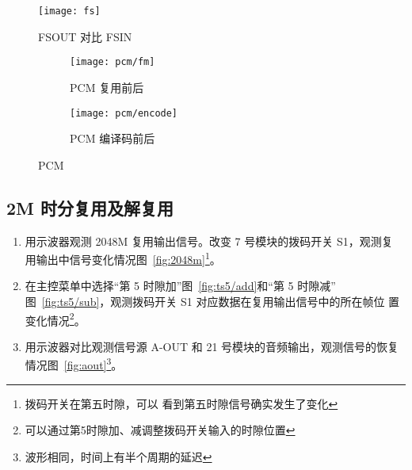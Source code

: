 \documentclass[../main]{subfiles}
\begin{document}
\begin{figure}[htbp]
  \centering
  \texttt{[image: fs]}
  \caption{FSOUT 对比 FSIN}%
  \label{fig:fs}
\end{figure}

\begin{figure}[htbp]
  \centering
  \begin{subfigure}[htbp]{0.45\linewidth}
    \centering
    \texttt{[image: pcm/fm]}
    \caption{PCM 复用前后}%
    \label{fig:pcm/fm}
  \end{subfigure}
  \quad
  \begin{subfigure}[htbp]{0.45\linewidth}
    \centering
    \texttt{[image: pcm/encode]}
    \caption{PCM 编译码前后}%
    \label{fig:pcm/encode}
  \end{subfigure}
  \caption{PCM}%
  \label{fig:pcm}
\end{figure}

\subsection{2M 时分复用及解复用}%
\label{sub:2m}


\begin{enumerate}
  \item 用示波器观测 2048M 复用输出信号。改变 7 号模块的拨码开关 S1，观测复
    用输出中信号变化情况图~\ref{fig:2048m}\footnote{拨码开关在第五时隙，可以
    看到第五时隙信号确实发生了变化}。
  \item 在主控菜单中选择“第 5 时隙加”图~\ref{fig:ts5/add}和“第 5 时隙减”
    图~\ref{fig:ts5/sub}，观测拨码开关 S1 对应数据在复用输出信号中的所在帧位
    置变化情况\footnote{可以通过第5时隙加、减调整拨码开关输入的时隙位置}。
  \item 用示波器对比观测信号源 A-OUT 和 21 号模块的音频输出，观测信号的恢复
    情况图~\ref{fig:aout}\footnote{波形相同，时间上有半个周期的延迟}。
\end{enumerate}
\end{document}
